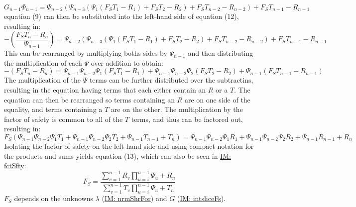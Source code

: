 \documentclass[12pt]{article}
\begin{document}
\begin{displaymath}
G_{n-1} Φ_{n-1}=Ψ_{n-2} \left(Ψ_{n-3} \left(Ψ_{1} \left({F_{S}} T_{1}-R_{1}\right)+{F_{S}} T_{2}-R_{2}\right)+{F_{S}} T_{n-2}-R_{n-2}\right)+{F_{S}} T_{n-1}-R_{n-1}
\end{displaymath}
equation (9) can then be substituted into the left-hand side of equation (12), resulting in:
\begin{displaymath}
-\left(\frac{{F_{S}} T_{n}-R_{n}}{Ψ_{n-1}}\right)=Ψ_{n-2} \left(Ψ_{n-3} \left(Ψ_{1} \left({F_{S}} T_{1}-R_{1}\right)+{F_{S}} T_{2}-R_{2}\right)+{F_{S}} T_{n-2}-R_{n-2}\right)+{F_{S}} T_{n-1}-R_{n-1}
\end{displaymath}
This can be rearranged by multiplying boths sides by $Ψ_{n-1}$ and then distributing the multiplication of each $Ψ$ over addition to obtain:
\begin{displaymath}
-\left({F_{S}} T_{n}-R_{n}\right)=Ψ_{n-1} Ψ_{n-2} Ψ_{1} \left({F_{S}} T_{1}-R_{1}\right)+Ψ_{n-1} Ψ_{n-2} Ψ_{2} \left({F_{S}} T_{2}-R_{2}\right)+Ψ_{n-1} \left({F_{S}} T_{n-1}-R_{n-1}\right)
\end{displaymath}
The multiplication of the $Ψ$ terms can be further distributed over the subtractins, resulting in the equation having terms that each either contain an $R$ or a $T$. The equation can then be rearranged so terms containing an $R$ are on one side of the equality, and terms containing a $T$ are on the other. The multiplication by the factor of safety is common to all of the $T$ terms, and thus can be factored out, resulting in:
\begin{displaymath}
{F_{S}} \left(Ψ_{n-1} Ψ_{n-2} Ψ_{1} T_{1}+Ψ_{n-1} Ψ_{n-2} Ψ_{2} T_{2}+Ψ_{n-1} T_{n-1}+T_{n}\right)=Ψ_{n-1} Ψ_{n-2} Ψ_{1} R_{1}+Ψ_{n-1} Ψ_{n-2} Ψ_{2} R_{2}+Ψ_{n-1} R_{n-1}+R_{n}
\end{displaymath}
Isolating the factor of safety on the left-hand side and using compact notation for the products and sums yields equation (13), which can also be seen in \hyperref[IM:fctSfty]{IM: fctSfty}:
\begin{displaymath}
{F_{S}}=\frac{\displaystyle\sum_{v=1}^{n-1}{R_{v} \displaystyle\prod_{u=i}^{n-1}{Ψ_{u}}}+R_{n}}{\displaystyle\sum_{v=1}^{n-1}{T_{v} \displaystyle\prod_{u=i}^{n-1}{Ψ_{u}}}+T_{n}}
\end{displaymath}
${F_{S}}$ depends on the unknowns $λ$ (\hyperref[IM:nrmShrFor]{IM: nrmShrFor}) and $G$ (\hyperref[IM:intsliceFs]{IM: intsliceFs}).
~\newline
\end{document}

